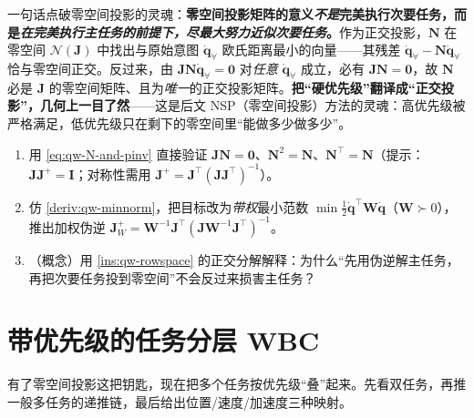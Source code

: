 \begin{insight}\label{ins:qw-priority-essence}
一句话点破零空间投影的灵魂：\textbf{零空间投影矩阵的意义\emph{不是}完美执行次要任务，而是\emph{在完美执行主任务的前提下，尽最大努力近似次要任务}。}作为正交投影，$\boldsymbol{N}$ 在零空间 $\mathcal{N}(\boldsymbol{J})$ 中找出与原始意图 $\dot{\boldsymbol{q}}_{\forall}$ 欧氏距离最小的向量——其残差 $\dot{\boldsymbol{q}}_{\forall}-\boldsymbol{N}\dot{\boldsymbol{q}}_{\forall}$ 恰与零空间正交。反过来，由 $\boldsymbol{J}\boldsymbol{N}\dot{\boldsymbol{q}}_{\forall}=\mathbf{0}$ 对\emph{任意} $\dot{\boldsymbol{q}}_{\forall}$ 成立，必有 $\boldsymbol{J}\boldsymbol{N}=\mathbf{0}$，故 $\boldsymbol{N}$ 必是 $\boldsymbol{J}$ 的零空间矩阵、且为\emph{唯一}的正交投影矩阵。\textbf{把“硬优先级”翻译成“正交投影”，几何上一目了然}——这是后文 NSP（零空间投影）方法的灵魂：高优先级被严格满足，低优先级只在剩下的零空间里“能做多少做多少”。
\end{insight}

\begin{practice}
\begin{enumerate}
  \item 用 \cref{eq:qw-N-and-pinv} 直接验证 $\boldsymbol{J}\boldsymbol{N}=\mathbf{0}$、$\boldsymbol{N}^2=\boldsymbol{N}$、$\boldsymbol{N}^\top=\boldsymbol{N}$（提示：$\boldsymbol{J}\boldsymbol{J}^+=\mathbf{I}$；对称性需用 $\boldsymbol{J}^+=\boldsymbol{J}^\top(\boldsymbol{J}\boldsymbol{J}^\top)^{-1}$）。
  \item 仿 \cref{deriv:qw-minnorm}，把目标改为\emph{带权}最小范数 $\min\tfrac12\dot{\boldsymbol{q}}^\top\boldsymbol{W}\dot{\boldsymbol{q}}$（$\boldsymbol{W}\succ0$），推出加权伪逆 $\boldsymbol{J}^{+}_{W}=\boldsymbol{W}^{-1}\boldsymbol{J}^\top(\boldsymbol{J}\boldsymbol{W}^{-1}\boldsymbol{J}^\top)^{-1}$。
  \item （概念）用 \cref{ins:qw-rowspace} 的正交分解解释：为什么“先用伪逆解主任务，再把次要任务投到零空间”不会反过来损害主任务？
\end{enumerate}
\end{practice}

\section{带优先级的任务分层 WBC}
\label{sec:qw-priority}

有了零空间投影这把钥匙，现在把多个任务按优先级“叠”起来。先看双任务，再推一般多任务的递推链，最后给出位置/速度/加速度三种映射。

